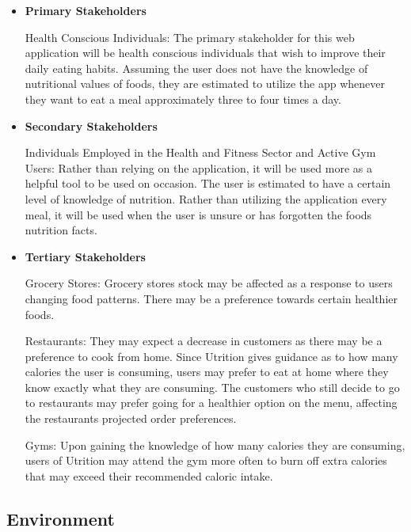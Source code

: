 \documentclass{article}
\begin{document}
\begin{itemize}
	\item \textbf{Primary Stakeholders} 

	\subitem Health Conscious Individuals: The primary stakeholder for this web application will be health conscious individuals that wish to improve their daily eating habits. Assuming the user does not have the knowledge of nutritional values of foods, they are estimated to utilize the app whenever they want to eat a meal approximately three to four times a day.\newline

	\item \textbf{Secondary Stakeholders} 

	\subitem Individuals Employed in the Health and Fitness Sector and Active Gym Users: Rather than relying on the application, it will be used more as a helpful tool to be used on occasion. The user is estimated to have a certain level of knowledge of nutrition. Rather than utilizing the application every meal, it will be used when the user is unsure or has forgotten the foods nutrition facts.\newline

	\item \textbf{Tertiary Stakeholders} 

	\subitem Grocery Stores: Grocery stores stock may be affected as a response to users changing food patterns. There may be a preference towards certain healthier foods.

	\subitem Restaurants: They may expect a decrease in customers as there may be a preference to cook from home. Since Utrition gives guidance as to how many calories the user is consuming, users may prefer to eat at home where they know exactly what they are consuming. The customers who still decide to go to restaurants may prefer going for a healthier option on the menu, affecting the restaurants projected order preferences.

	\subitem Gyms: Upon gaining the knowledge of how many calories they are consuming, users of Utrition may attend the gym more often to burn off extra calories that may exceed their recommended caloric intake. 

\end{itemize}


\subsection{Environment}
\end{document}
